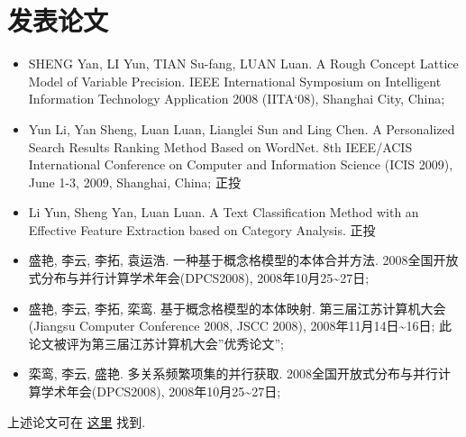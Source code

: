 \documentclass[a4paper,10pt,english]{manual}
\begin{document}
\section{发表论文}
\begin{itemize}
\item {} 
SHENG Yan, LI Yun, TIAN Su-fang, LUAN Luan. A Rough Concept Lattice Model of Variable Precision. IEEE International Symposium on Intelligent Information Technology Application 2008 (IITA`08), Shanghai City, China;

\item {} 
Yun Li, Yan Sheng, Luan Luan, Lianglei Sun and Ling Chen. A Personalized Search Results Ranking Method Based on WordNet. 8th IEEE/ACIS International Conference on Computer and Information Science (ICIS 2009), June 1-3, 2009, Shanghai, China; 正投

\item {} 
Li Yun, Sheng Yan, Luan Luan. A Text Classification Method with an Effective Feature Extraction based on Category Analysis. 正投

\item {} 
盛艳, 李云, 李拓, 袁运浩. 一种基于概念格模型的本体合并方法. 2008全国开放式分布与并行计算学术年会(DPCS2008), 2008年10月25\textasciitilde{}27日;

\item {} 
盛艳, 李云, 李拓, 栾鸾. 基于概念格模型的本体映射. 第三届江苏计算机大会(Jiangsu Computer Conference 2008, JSCC 2008), 2008年11月14日\textasciitilde{}16日; 此论文被评为第三届江苏计算机大会''优秀论文'';

\item {} 
栾鸾, 李云, 盛艳. 多关系频繁项集的并行获取. 2008全国开放式分布与并行计算学术年会(DPCS2008), 2008年10月25\textasciitilde{}27日;

\end{itemize}

上述论文可在 \href{http://github.com/lizzie/lizworkspace/tree/cb82ad8d84a1b1a12df80e3508e3629abf09ac83/paper}{这里} 找到.
\end{document}
